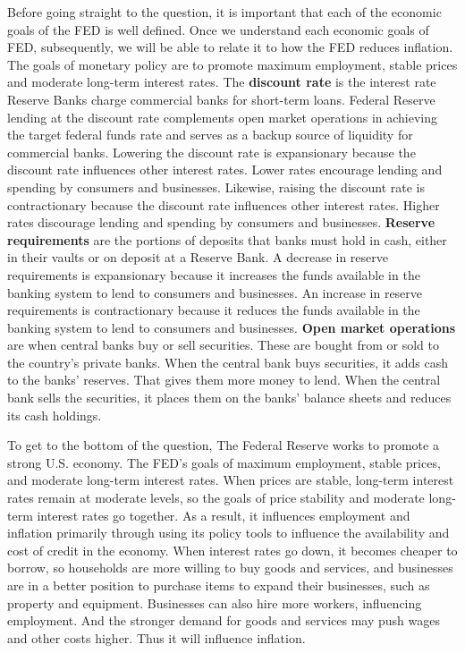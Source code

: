 \documentclass[
]{article}
\begin{document}
Before going straight to the question, it is important that each of the
economic goals of the FED is well defined. Once we understand each
economic goals of FED, subsequently, we will be able to relate it to how
the FED reduces inflation. The goals of monetary policy are to promote
maximum employment, stable prices and moderate long-term interest rates.
The \textbf{discount rate} is the interest rate Reserve Banks charge
commercial banks for short-term loans. Federal Reserve lending at the
discount rate complements open market operations in achieving the target
federal funds rate and serves as a backup source of liquidity for
commercial banks. Lowering the discount rate is expansionary because the
discount rate influences other interest rates. Lower rates encourage
lending and spending by consumers and businesses. Likewise, raising the
discount rate is contractionary because the discount rate influences
other interest rates. Higher rates discourage lending and spending by
consumers and businesses. \textbf{Reserve requirements} are the portions
of deposits that banks must hold in cash, either in their vaults or on
deposit at a Reserve Bank. A decrease in reserve requirements is
expansionary because it increases the funds available in the banking
system to lend to consumers and businesses. An increase in reserve
requirements is contractionary because it reduces the funds available in
the banking system to lend to consumers and businesses. \textbf{Open
market operations} are when central banks buy or sell securities. These
are bought from or sold to the country's private banks. When the central
bank buys securities, it adds cash to the banks' reserves. That gives
them more money to lend. When the central bank sells the securities, it
places them on the banks' balance sheets and reduces its cash holdings.

To get to the bottom of the question, The Federal Reserve works to
promote a strong U.S. economy. The FED's goals of maximum employment,
stable prices, and moderate long-term interest rates. When prices are
stable, long-term interest rates remain at moderate levels, so the goals
of price stability and moderate long-term interest rates go together. As
a result, it influences employment and inflation primarily through using
its policy tools to influence the availability and cost of credit in the
economy. When interest rates go down, it becomes cheaper to borrow, so
households are more willing to buy goods and services, and businesses
are in a better position to purchase items to expand their businesses,
such as property and equipment. Businesses can also hire more workers,
influencing employment. And the stronger demand for goods and services
may push wages and other costs higher. Thus it will influence inflation.
\end{document}
